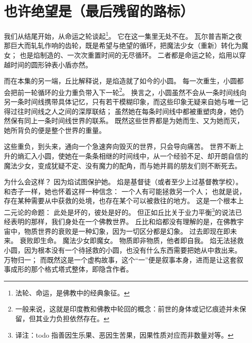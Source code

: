 \chapter[也许绝望是（最后残留的路标）]{也许绝望是\protect\footnotemark（最后残留的路标）}


我们从结尾开始，从命运之轮谈起\footnote{%
    法轮、命运，是佛教中的经典象征。
}\cite{ref62}。
它在这一集里无处不在。
瓦尔普吉斯之夜那巨大而轧轧作响的齿轮，既是希望与绝望的循环，把魔法少女（重新）转化为魔女；
也是焰制造的、一次次重置时间的无尽循环。
二者都是命运之轮，焰用以穿越时间的圆形钟表小盾亦然。

而在本集的另一端，丘比解释说，是焰造就了如今的小圆。
每一次重生，小圆都会把前一轮循环的业力重负带入下一轮\footnote{%
    一般来说，这就是印度教和佛教中轮回的概念：前世的身体或记忆痕迹并未保留，但其业力负担依然存在。
}\cite{ref65}。
换言之，小圆虽然不会从一条时间线向另一条时间线携带具体记忆，只有若干模糊印象，而这些印象无疑来自她与唯一记得过往时间线之人之间的深厚联结；
虽然她在每条时间线中都被重塑肉身，她仍然保有同上一条时间线世界的联系。
既然这些世界都是为她而生、又为她而灭，她所背负的便是整个世界的重量。

这些重负，到头来，通向一个急速奔向毁灭的世界，只会导向痛苦\cite{ref62}。
世界不断上升的熵汇入小圆，使她在一条条相继的时间线中，从一个经验不足、却开朗自信的魔法少女，变成犹疑不定、没有魔力的配角，而与她并肩的朋友们则不断死去。

为什么会这样？
因为焰试图保护她。
焰是基督徒（或者至少上过基督教学校）。
和杏子一样，她也怀着这样一种信念：
一个人有可能拯救另一个人；
也就是说，存在某种需要从中获救的处境，也存在某个可以被救往的地方。
这是一个根本上二元论的命题：
此处是坏的，彼处是好的。
但正如丘比关于业力平衡\footnote{%
    译注：todo 指善因生乐果、恶因生苦果，因果性质对应而非数量对等。
}的说法已经表明的那样，我们身处在一个佛教世界。
丘比和焰都没有理解的是，在佛教宇宙中，物质世界的衰败是一种幻象，因为一切区分都是幻象\cite{ref63}。
过去即现在即未来。
衰败即生命。
魔法少女即魔女。
物质即非物质，他者即自我。
焰无法拯救小圆，因为根本没有一个待拯救的小圆，也没有什么东西需要把她从中救出来。
万物归一；
而既然这是一个虚构故事，这个“一”便是叙事本身，进而是让这套叙事成形的那个格式塔式整体，即隐含作者。


